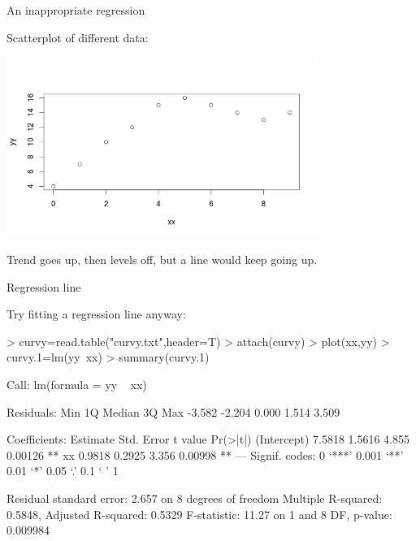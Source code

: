 \documentclass{beamer}
\begin{document}
\begin{frame}[fragile]{An inappropriate regression}

Scatterplot of different data:

\includegraphics[width=4in]{curvy-scatter}

Trend goes up, then levels off, but a line would keep going up.

\end{frame}

\begin{frame}[fragile]{Regression line}

Try fitting a regression line anyway:

\begin{Schunk}
\begin{Sinput}
> curvy=read.table("curvy.txt",header=T)
> attach(curvy)
> plot(xx,yy)
> curvy.1=lm(yy~xx)
> summary(curvy.1)
\end{Sinput}
\begin{Soutput}
Call:
lm(formula = yy ~ xx)

Residuals:
   Min     1Q Median     3Q    Max 
-3.582 -2.204  0.000  1.514  3.509 

Coefficients:
            Estimate Std. Error t value Pr(>|t|)   
(Intercept)   7.5818     1.5616   4.855  0.00126 **
xx            0.9818     0.2925   3.356  0.00998 **
---
Signif. codes:  0 ‘***’ 0.001 ‘**’ 0.01 ‘*’ 0.05 ‘.’ 0.1 ‘ ’ 1

Residual standard error: 2.657 on 8 degrees of freedom
Multiple R-squared:  0.5848,	Adjusted R-squared:  0.5329 
F-statistic: 11.27 on 1 and 8 DF,  p-value: 0.009984
\end{Soutput}
\end{Schunk}


  
\end{frame}
\end{document}
